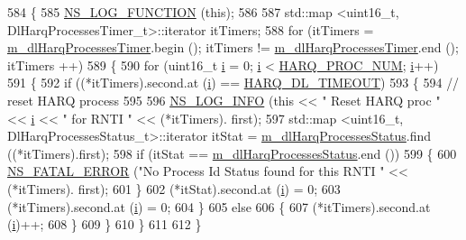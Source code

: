 \begin{DoxyCode}
584 \{
585   \hyperlink{log-macros-disabled_8h_a90b90d5bad1f39cb1b64923ea94c0761}{NS\_LOG\_FUNCTION} (\textcolor{keyword}{this});
586 
587   std::map <uint16\_t, DlHarqProcessesTimer\_t>::iterator itTimers;
588   \textcolor{keywordflow}{for} (itTimers = \hyperlink{classns3_1_1RrFfMacScheduler_ab5040cff67dad6c8fdfc9c32c90916df}{m\_dlHarqProcessesTimer}.begin (); itTimers != 
      \hyperlink{classns3_1_1RrFfMacScheduler_ab5040cff67dad6c8fdfc9c32c90916df}{m\_dlHarqProcessesTimer}.end (); itTimers ++)
589     \{
590       \textcolor{keywordflow}{for} (uint16\_t \hyperlink{bernuolliDistribution_8m_a6f6ccfcf58b31cb6412107d9d5281426}{i} = 0; \hyperlink{bernuolliDistribution_8m_a6f6ccfcf58b31cb6412107d9d5281426}{i} < \hyperlink{cqa-ff-mac-scheduler_8h_a9185d8d7d2b2979181d4a7044a3d3555}{HARQ\_PROC\_NUM}; \hyperlink{bernuolliDistribution_8m_a6f6ccfcf58b31cb6412107d9d5281426}{i}++)
591         \{
592           \textcolor{keywordflow}{if} ((*itTimers).second.at (\hyperlink{bernuolliDistribution_8m_a6f6ccfcf58b31cb6412107d9d5281426}{i}) == \hyperlink{cqa-ff-mac-scheduler_8h_add9e0c4889dc1b5b25686480b31ad166}{HARQ\_DL\_TIMEOUT})
593             \{
594               \textcolor{comment}{// reset HARQ process}
595 
596               \hyperlink{group__logging_gafbd73ee2cf9f26b319f49086d8e860fb}{NS\_LOG\_INFO} (\textcolor{keyword}{this} << \textcolor{stringliteral}{" Reset HARQ proc "} << \hyperlink{bernuolliDistribution_8m_a6f6ccfcf58b31cb6412107d9d5281426}{i} << \textcolor{stringliteral}{" for RNTI "} << (*itTimers).
      first);
597               std::map <uint16\_t, DlHarqProcessesStatus\_t>::iterator itStat = 
      \hyperlink{classns3_1_1RrFfMacScheduler_aa3d12b5abcb9afeea093150a6572aaed}{m\_dlHarqProcessesStatus}.find ((*itTimers).first);
598               \textcolor{keywordflow}{if} (itStat == \hyperlink{classns3_1_1RrFfMacScheduler_aa3d12b5abcb9afeea093150a6572aaed}{m\_dlHarqProcessesStatus}.end ())
599                 \{
600                   \hyperlink{group__fatal_ga5131d5e3f75d7d4cbfd706ac456fdc85}{NS\_FATAL\_ERROR} (\textcolor{stringliteral}{"No Process Id Status found for this RNTI "} << (*itTimers).
      first);
601                 \}
602               (*itStat).second.at (\hyperlink{bernuolliDistribution_8m_a6f6ccfcf58b31cb6412107d9d5281426}{i}) = 0;
603               (*itTimers).second.at (\hyperlink{bernuolliDistribution_8m_a6f6ccfcf58b31cb6412107d9d5281426}{i}) = 0;
604             \}
605           \textcolor{keywordflow}{else}
606             \{
607               (*itTimers).second.at (\hyperlink{bernuolliDistribution_8m_a6f6ccfcf58b31cb6412107d9d5281426}{i})++;
608             \}
609         \}
610     \}
611 
612 \}
\end{DoxyCode}


